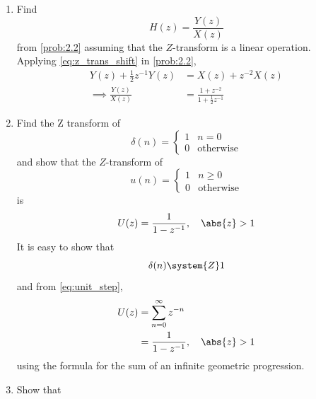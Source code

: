 \documentclass[journal,12pt,twocolumn]{IEEEtran}
\theoremstyle{remark}
\begin{document}
\begin{enumerate}[label=\thesection.\arabic*]
								\item Find
								\begin{equation}
								H(z) = \frac{Y(z)}{X(z)}
								\end{equation}
								from  \eqref{prob:2.2} assuming that the $Z$-transform is a linear operation.
								\\
								\solution  Applying \eqref{eq:z_trans_shift} in \eqref{prob:2.2},
								\begin{align}
								Y(z) + \frac{1}{2}z^{-1}Y(z) &= X(z)+z^{-2}X(z)
								\\
								\implies \frac{Y(z)}{X(z)} &= \frac{1 + z^{-2}}{1 + \frac{1}{2}z^{-1}}
								\label{eq:freq_resp}
								\end{align}
								\item Find the Z transform of 
								\begin{equation}
								\delta(n)
								=
								\begin{cases}
								1 & n = 0
								\\
								0 & \text{otherwise}
								\end{cases}
								\end{equation}
								and show that the $Z$-transform of
								\begin{equation}
								\label{eq:unit_step}
								u(n)
								=
								\begin{cases}
								1 & n \ge 0
								\\
								0 & \text{otherwise}
								\end{cases}
								\end{equation}
								is
								\begin{equation}
								U(z) = \frac{1}{1-z^{-1}}, \quad \abs{z} > 1
								\end{equation}
								\solution It is easy to show that
								\begin{equation}
								\delta(n) \system{Z} 1
								\end{equation}
								and from \eqref{eq:unit_step},
								\begin{align}
								U(z) &= \sum _{n= 0}^{\infty}z^{-n}
								\\
								&=\frac{1}{1-z^{-1}}, \quad \abs{z} > 1
								\end{align}
								using the formula for the sum of an infinite geometric progression.
								\item Show that 
								\begin{equation}

\end{equation}
\end{enumerate}
\end{document}
